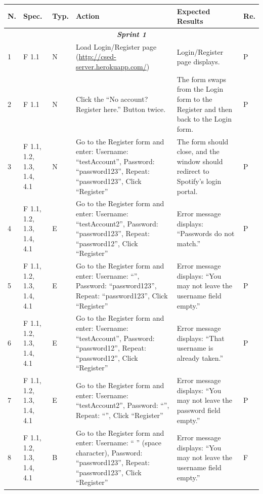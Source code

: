 \documentclass[10pt, notitlepage]{report}
\begin{document}
\begin{longtable}{| p{0.4cm} | p{1.8cm} | p{0.7cm} | p{6.5cm} | p{4.5cm} | p{0.5cm}|}
\endfirsthead
\endlastfoot

\multicolumn{5}{c}{\textit{Continued from last page}}
\endhead

\multicolumn{5}{c}{\textit{Continued on next page}} 
\endfoot

\hline
\textbf{N.} & \textbf{Spec. } & \textbf{Typ.} & \textbf{Action} & \textbf{Expected Results}  & \textbf{Re.}\\
\hline
\multicolumn{6}{|c|}{\textit{\textbf{Sprint 1}}} \\
\hline

1&F 1.1&N&Load Login/Register page (\url{http://csed-server.herokuapp.com/})&Login/Register page displays.&P\\ \hline
2&F 1.1&N&Click the “No account? Register here.” Button twice.&The form swaps from the Login form to the Register and then back to the Login form.&P\\ \hline
3&F 1.1, 1.2, 1.3, 1.4, 4.1&N&Go to the Register form and enter: Username: “testAccount”, Password: “password123”, Repeat: “password123”, Click “Register”&The form should close, and the window should redirect to Spotify’s login portal.&P\\ \hline
4&F 1.1, 1.2, 1.3, 1.4, 4.1&E&Go to the Register form and enter: Username: “testAccount2”, Password: “password123”, Repeat: “password12”, Click “Register”&Error message displays: “Passwords do not match.”&P\\ \hline
5&F 1.1, 1.2, 1.3, 1.4, 4.1&E&Go to the Register form and enter: Username: “”, Password: “password123”, Repeat: “password123”, Click “Register”&Error message displays: “You may not leave the username field empty.”&P\\ \hline
6&F 1.1, 1.2, 1.3, 1.4, 4.1&E&Go to the Register form and enter: Username: “testAccount”, Password: “password12”, Repeat: “password12”, Click “Register”&Error message displays: “That username is already taken.”&P\\ \hline
7&F 1.1, 1.2, 1.3, 1.4, 4.1&E&Go to the Register form and enter: Username: “testAccount2”, Password: “”, Repeat: “”, Click “Register”&Error message displays: “You may not leave the password field empty.”&P\\ \hline
8&F 1.1, 1.2, 1.3, 1.4, 4.1&B&Go to the Register form and enter: Username: “ ” (space character), Password: “password123”, Repeat: “password123”, Click “Register”&Error message displays: “You may not leave the username field empty.”&F\\ \hline

\end{longtable}
\end{document}
